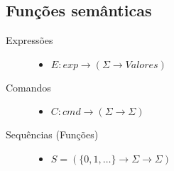 \documentclass[a4 paper, 12pt]{article}
\begin{document}
\subsection{Fun\c c\~oes sem\^anticas}
\begin{description}
\item[Express\~oes]\hfill
  \begin{itemize}
  \item $E: exp \to (\Sigma \to Valores)$
  \end{itemize}
\item[Comandos]\hfill
  \begin{itemize}
  \item $C: cmd \to (\Sigma \to \Sigma)$
  \end{itemize}
\item[Sequ\^encias (Fun\c c\~oes)]\hfill
  \begin{itemize}
  \item $S = (\{0, 1, \ldots\} \to \Sigma
    \to \Sigma)$
  \end{itemize}
\end{description}
\end{document}
